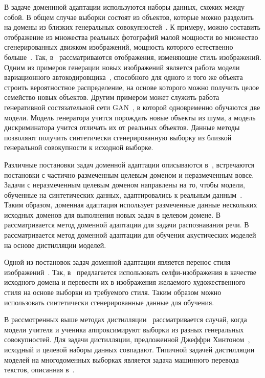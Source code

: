 В задаче доменнной адаптации используются наборы данных, схожих между собой. В общем случае выборки состоят из объектов, которые можно разделить на домены из близких генеральных совокупностей~\cite{image_to_image, DA via prompt learning}. К примеру, можно составить отображение из множества реальных фотографий малой мощности во множество сгенерированных движком изображений, мощность которого естественно больше~\cite{DA,UDA}. Так, в~\cite{image_to_image, Transfer Learning} рассматриваются отображения, изменяющие стиль изображений. Одним из примеров генерации новых изображений является работа модели вариационного автокодировщика~\cite{VAE}, способного для одного и того же объекта строить вероятностное распределение, на основе которого можно получить целое семейство новых объектов. Другим примером может служить работа генеративной состязательной сети GAN~\cite{GAN}, в которой одновременно обучаются две модели. Модель генератора учится порождать новые объекты из шума, а модель дискриминатора учится отличать их от реальных объектов. Данные методы позволяют получить синтетически сгенерированную выборку из близкой генеральной совокупности к исходной выборке.

Различные постановки задач доменной адаптации описываются в~\cite{DeepvisDA}, встречаются постановки с частично размеченным целевым доменом и неразмеченным вовсе. Задачи с неразмеченным целевым доменом направлены на то, чтобы модели, обученные на синтетических данных, адаптировались к реальным данным~\cite{UDA}. Таким образом, доменная адаптация использует размеченные данные нескольких исходных доменов для выполнения новых задач в целевом домене.
В~\cite{MDASR} рассматривается метод доменной адаптации для задачи распознавания речи. В~\cite{Acoustic Models} рассматривается метод доменной адаптации для обучения акустических моделей на основе дистилляции моделей.

Одной из постановок задач доменной адаптации является перенос стиля изображений~\cite{image_to_image, Transfer Learning}.
Так, в~\cite{image_to_image} предлагается использовать селфи-изображения в качестве исходного домена и перевести их в изображения желаемого художественного стиля на основе выборки из требуемого стиля. Таким образом можно использовать синтетически сгенерированные данные для обучения.

В рассмотренных выше методах дистилляции~\cite{Hinton2015, Vapnik2016, Grabovoy2021} рассматривается случай, когда модели учителя и ученика аппроксимируют выборки из разных генеральных совокупностей. Для задачи дистилляции, предложенной Джеффри Хинтоном~\cite{Hinton2015}, исходный и целевой наборы данных совпадают.
Типичной задачей дистилляции моделей на многодоменных выборках является задача машинного перевода текстов, описанная в~\cite{KimRush2016}.


